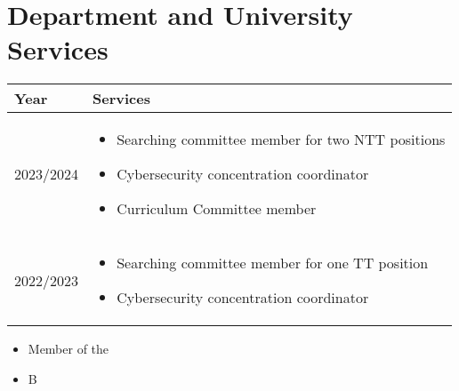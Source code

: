 
\section*{Department and University Services}

\begin{longtable}{|p{1in}|p{5in}|}
    \hline
    \rowcolor{lightgray}
    \textbf{Year}   &   \textbf{Services}\\
    \hline
    2023/2024   &   
    \begin{itemize}
        \item Searching committee member for two NTT positions
        \item Cybersecurity concentration coordinator
        \item Curriculum Committee member
    \end{itemize}
    \\
    \hline
    2022/2023   &  
    \begin{itemize}
        \item Searching committee member for one TT position
        \item Cybersecurity concentration coordinator
    \end{itemize} 
    \\
    \hline
\end{longtable}



\begin{itemize}
    \item Member of the 
    \item B
\end{itemize}